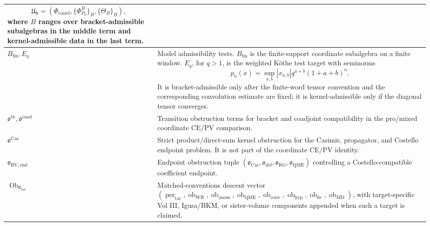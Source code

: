 \begin{longtable}{@{}>{\raggedright\arraybackslash}p{}
  >{\raggedright\arraybackslash}p{}@{}}
\[
  \mathfrak U_{\mathfrak h}
  =(\Phi_{\mathrm{coord}},\{\Phi^B_{P_0}\}_B,\{\Theta_B\}_B),
\]
where \(B\) ranges over bracket-admissible subalgebras in the middle term
and kernel-admissible data in the last term.\\
\hline
\(B_{\mathrm{fin}},E_q\) &
Model admissibility tests.  \(B_{\mathrm{fin}}\) is the finite-support
coordinate subalgebra on a finite window.  \(E_q\), for \(q>1\), is the
weighted Köthe test target with seminorms
\[
  p_n(x)=\sup_{a,b}|x_{a,b}|q^{a+b}(1+a+b)^n .
\]
It is bracket-admissible only after the finite-word tensor convention
and the corresponding convolution estimate are fixed; it is
kernel-admissible only if the diagonal tensor converges.\\
\hline
\(\mathfrak o^{\mathrm{br}},
  \mathfrak o^{\mathrm{coad}}\) &
Transition obstruction terms for bracket and coadjoint compatibility in
the pro/mixed coordinate CE/PV comparison.\\
\hline
\(\mathfrak o^{\mathrm{Cas}}\) &
Strict product/direct-sum kernel obstruction for the Casimir,
propagator, and Costello endpoint problem. It is not part of the
coordinate CE/PV identity.\\
\hline
\(\mathfrak o_{\mathrm{BV,end}}\) &
Endpoint obstruction tuple
\((\mathfrak o_{\mathrm{Cas}},
  \mathfrak o_{\mathrm{def}},
  \mathfrak o_{\mathrm{RG}},
  \mathfrak o_{\mathrm{QME}})\) controlling a Costello-compatible
coefficient endpoint.\\
\hline
\(\operatorname{Ob}_{\mathfrak C_{\mathrm{tar}}}\) &
Matched-conventions descent vector
\((\operatorname{per}_{\mathrm{tar}},
  \operatorname{ob}_{\mathrm{WR}},
  \operatorname{ob}_{\mathrm{anom}},
  \operatorname{ob}_{\mathrm{QME}},
  \operatorname{ob}_{\mathrm{conv}},
  \operatorname{ob}_{\mathrm{hyp}},
  \operatorname{ob}_{6r},
  \operatorname{ob}_{\mathrm{MD}})\), with target-specific Vol III,
Igusa/BKM, or sister-volume components appended when such a target is
claimed.\\
\hline
\end{longtable}


